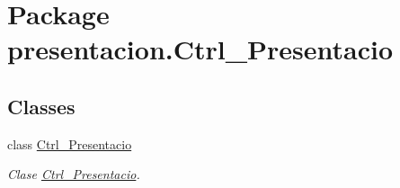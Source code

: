 \hypertarget{namespacepresentacion_1_1Ctrl__Presentacio}{}\section{Package presentacion.\+Ctrl\+\_\+\+Presentacio}
\label{namespacepresentacion_1_1Ctrl__Presentacio}
\subsection*{Classes}
\begin{DoxyCompactItemize}
\item 
class \hyperlink{classpresentacion_1_1Ctrl__Presentacio_1_1Ctrl__Presentacio}{Ctrl\+\_\+\+Presentacio}
\begin{DoxyCompactList}\small\item\em Clase \hyperlink{classpresentacion_1_1Ctrl__Presentacio_1_1Ctrl__Presentacio}{Ctrl\+\_\+\+Presentacio}. \end{DoxyCompactList}\end{DoxyCompactItemize}
